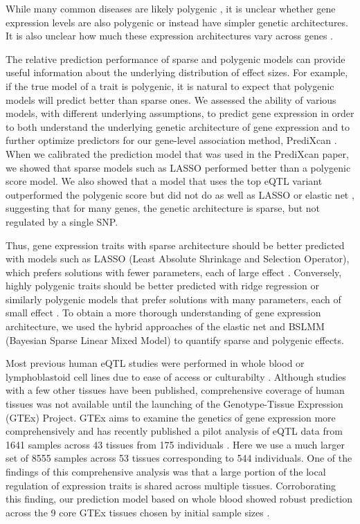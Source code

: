 \documentclass[10pt,letterpaper]{article}
\begin{document}
While many common diseases are likely polygenic \cite{Purcell_2009,Stahl_2012,Morris_2012}, it is unclear whether gene expression levels are also polygenic or instead have simpler genetic architectures. It is also unclear how much these expression architectures vary across genes \cite{Albert_2015}. 

The relative prediction performance of sparse and polygenic models can provide useful information about the underlying distribution of effect sizes. For example, if the true model of a trait is polygenic, it is natural to expect that polygenic models will predict better than sparse ones. We assessed the ability of various models, with different underlying assumptions, to predict gene expression in order to both understand the underlying genetic architecture of gene expression and to further optimize predictors for our gene-level association method, PrediXcan \cite{Gamazon_2015}. When we calibrated the prediction model that was used in the PrediXcan paper, we showed that sparse models such as LASSO performed better than a polygenic score model. We also showed that a model that uses the top eQTL variant outperformed the polygenic score but did not do as well as LASSO or elastic net \cite{Gamazon_2015}, suggesting that for many genes, the genetic architecture is sparse, but not regulated by a single SNP. 

Thus, gene expression traits with sparse architecture should be better predicted with models such as LASSO (Least Absolute Shrinkage and Selection Operator), which prefers solutions with fewer parameters, each of large effect \cite{Tibshirani_1996}. Conversely, highly polygenic traits should be better predicted with ridge regression or similarly polygenic models that prefer solutions with many parameters, each of small effect \cite{Hoerl_1970,de_los_Campos_2010,Wheeler_2014}. To obtain a more thorough understanding of gene expression architecture, we used the hybrid approaches of the elastic net and BSLMM (Bayesian Sparse Linear Mixed Model) \cite{Zhou_2013} to quantify sparse and polygenic effects.

Most previous human eQTL studies were performed in whole blood or lymphoblastoid cell lines due to ease of access or culturabilty \cite{Stranger_2007,Cheung_2005,Battle_2013}. Although studies with a few other tissues have been published, comprehensive coverage of human tissues was not available until the launching of the Genotype-Tissue Expression (GTEx) Project. GTEx aims to examine the genetics of gene expression more comprehensively and has recently published a pilot analysis of eQTL data from 1641 samples across 43 tissues from 175 individuals \cite{Ardlie_2015}. Here we use a much larger set of 8555 samples across 53 tissues corresponding to 544 individuals. One of the findings of this comprehensive analysis was that a large portion of the local regulation of expression traits is shared across multiple tissues. Corroborating this finding, our prediction model based on whole blood showed robust prediction across the 9 core GTEx tissues chosen by initial sample sizes \cite{Gamazon_2015}.
\end{document}
